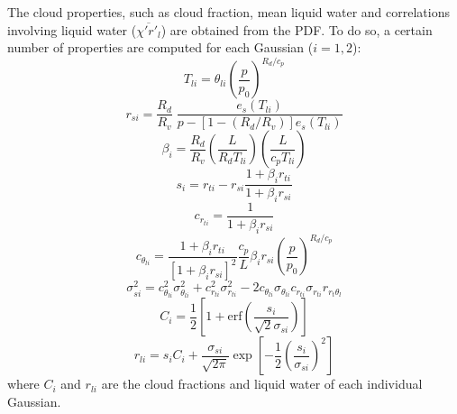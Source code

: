 \documentclass[11pt,fleqn]{article}
\begin{document}
The cloud properties, such as cloud fraction, mean liquid water
and correlations involving liquid water ($\overline{\chi'r'_l}$)
are obtained from the PDF. To do so, a certain number of properties
are computed for each Gaussian ($i=1,2$):
%
\begin{equation}
T_{li} = \theta_{li} \left( \frac{p}{p_0} \right)^{R_d/c_p}
\end{equation}
%
\begin{equation}
\label{eq:rs_def}
r_{si} = \frac{R_d}{R_v}\; \frac{e_s(T_{li})}{p-[1-(R_d/R_v)] e_s(T_{li})}
\end{equation}
%
\begin{equation}
\label{eq:beta_def}
\beta_i =
\frac{R_d}{R_v} \left( \frac{L}{R_d T_{li}} \right) 
\left( \frac{L}{c_p T_{li}} \right)
\end{equation}
%
\begin{equation}
\label{eq:s_def}
s_i = r_{ti} - r_{si}\frac{1+\beta_i r_{ti}}{1+\beta_i r_{si}}
\end{equation}
%
\begin{equation}
c_{r_{ti}} = \frac{1}{1 + \beta_i r_{si}}
\end{equation}
%
\begin{equation}
c_{\theta_{li}} 
= \frac{1 + \beta_i r_{ti}}
       {[1 + \beta_i r_{si}]^2}
  \frac{c_p}{L} \beta_i r_{si}
  \left( \frac{p}{p_0} \right)^{R_d/c_p}
\end{equation}
%
\begin{equation}
\sigma_{si}^2 
= c_{\theta_{li}}^2 \sigma_{\theta_{li}}^2 
+ c_{r_{ti}}^2 \sigma_{r_{ti}}^2
- 2 c_{\theta_{li}} \sigma_{\theta_{li}} 
    c_{r_{ti}} \sigma_{r_{ti}} r_{r_t \theta_l}
\end{equation}
%
\begin{equation}
\label{eq:C_gauss}
C_i = \frac{1}{2} 
      \left[ 
        1 + \mathrm{erf} \left( \frac{s_i}{\sqrt{2}\sigma_{si}} \right) 
      \right]
\end{equation}
%
\begin{equation}
\label{eq:rl_gauss}
r_{li} 
= s_i C_i
+ \frac{\sigma_{si}}{\sqrt{2\pi}} 
  \exp \left[ 
         -\frac{1}{2}\left( \frac{s_i}{\sigma_{si}} \right)^2 
       \right]
\end{equation}
%
where $C_i$ and $r_{li}$ are the cloud fractions and liquid water of
each individual Gaussian.
\end{document}
